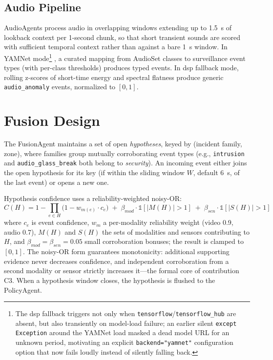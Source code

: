 \subsection{Audio Pipeline}

AudioAgents process audio in overlapping windows extending up to 1.5~s of lookback context per 1-second chunk, so that short transient sounds are scored with sufficient temporal context rather than against a bare 1~s window. In YAMNet mode\footnote{The \gls{dsp} fallback triggers not only when \texttt{tensorflow}/\texttt{tensorflow\_hub} are absent, but also transiently on model-load failure; an earlier silent \texttt{except Exception} around the YAMNet load masked a dead model URL for an unknown period, motivating an explicit \texttt{backend="yamnet"} configuration option that now fails loudly instead of silently falling back.} \cite{tensorflow_yamnet}, a curated mapping from AudioSet classes to surveillance event types (with per-class thresholds) produces typed events. In \gls{dsp} fallback mode, rolling z-scores of short-time energy and spectral flatness produce generic \texttt{audio\_anomaly} events, normalized to $[0,1]$.

\section{Fusion Design}
\label{sec:design_fusion}

The FusionAgent maintains a set of open \emph{hypotheses}, keyed by (incident family, zone), where families group mutually corroborating event types (e.g., \texttt{intrusion} and \texttt{audio\_glass\_break} both belong to \emph{security}). An incoming event either joins the open hypothesis for its key (if within the sliding window $W$, default 6~s, of the last event) or opens a new one.

Hypothesis confidence uses a reliability-weighted noisy-OR:
\begin{equation}
    C(H) = 1 - \prod_{e \in H} \bigl(1 - w_{m(e)} \cdot c_e\bigr) \;+\; \beta_{mod} \cdot \mathbb{1}[|M(H)|>1] \;+\; \beta_{sen} \cdot \mathbb{1}[|S(H)|>1]
\label{eq:noisyor}
\end{equation}
where $c_e$ is event confidence, $w_{m}$ a per-modality reliability weight (video 0.9, audio 0.7), $M(H)$ and $S(H)$ the sets of modalities and sensors contributing to $H$, and $\beta_{mod}=\beta_{sen}=0.05$ small corroboration bonuses; the result is clamped to $[0,1]$. The noisy-OR form guarantees monotonicity: additional supporting evidence never decreases confidence, and independent corroboration from a second modality or sensor strictly increases it---the formal core of contribution C3. When a hypothesis window closes, the hypothesis is flushed to the PolicyAgent.

